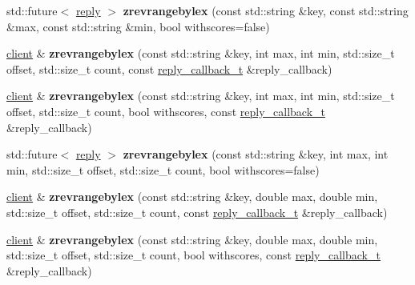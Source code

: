 \begin{DoxyCompactItemize}
\item 
\mbox{\label{classcpp__redis_1_1client_a14f97f6f766c825aadd5630300d07ea5}} 
std\+::future$<$ \hyperlink{classcpp__redis_1_1reply}{reply} $>$ {\bfseries zrevrangebylex} (const std\+::string \&key, const std\+::string \&max, const std\+::string \&min, bool withscores=false)
\item 
\mbox{\label{classcpp__redis_1_1client_a8e238a355f6567a90ce182326a478cc1}} 
\hyperlink{classcpp__redis_1_1client}{client} \& {\bfseries zrevrangebylex} (const std\+::string \&key, int max, int min, std\+::size\+\_\+t offset, std\+::size\+\_\+t count, const \hyperlink{classcpp__redis_1_1client_a061a1140d36d2eaeda82b09a0bb3f9f2}{reply\+\_\+callback\+\_\+t} \&reply\+\_\+callback)
\item 
\mbox{\label{classcpp__redis_1_1client_a8bb859ca66c7bbe584181c2af6cbd024}} 
\hyperlink{classcpp__redis_1_1client}{client} \& {\bfseries zrevrangebylex} (const std\+::string \&key, int max, int min, std\+::size\+\_\+t offset, std\+::size\+\_\+t count, bool withscores, const \hyperlink{classcpp__redis_1_1client_a061a1140d36d2eaeda82b09a0bb3f9f2}{reply\+\_\+callback\+\_\+t} \&reply\+\_\+callback)
\item 
\mbox{\label{classcpp__redis_1_1client_a05c02025eba044745de5da4d8ddfa778}} 
std\+::future$<$ \hyperlink{classcpp__redis_1_1reply}{reply} $>$ {\bfseries zrevrangebylex} (const std\+::string \&key, int max, int min, std\+::size\+\_\+t offset, std\+::size\+\_\+t count, bool withscores=false)
\item 
\mbox{\label{classcpp__redis_1_1client_a965894df56553bd06775a2d2779769e6}} 
\hyperlink{classcpp__redis_1_1client}{client} \& {\bfseries zrevrangebylex} (const std\+::string \&key, double max, double min, std\+::size\+\_\+t offset, std\+::size\+\_\+t count, const \hyperlink{classcpp__redis_1_1client_a061a1140d36d2eaeda82b09a0bb3f9f2}{reply\+\_\+callback\+\_\+t} \&reply\+\_\+callback)
\item 
\mbox{\label{classcpp__redis_1_1client_a897aa613007343505697a2fe276b0925}} 
\hyperlink{classcpp__redis_1_1client}{client} \& {\bfseries zrevrangebylex} (const std\+::string \&key, double max, double min, std\+::size\+\_\+t offset, std\+::size\+\_\+t count, bool withscores, const \hyperlink{classcpp__redis_1_1client_a061a1140d36d2eaeda82b09a0bb3f9f2}{reply\+\_\+callback\+\_\+t} \&reply\+\_\+callback)

\end{DoxyCompactItemize}
